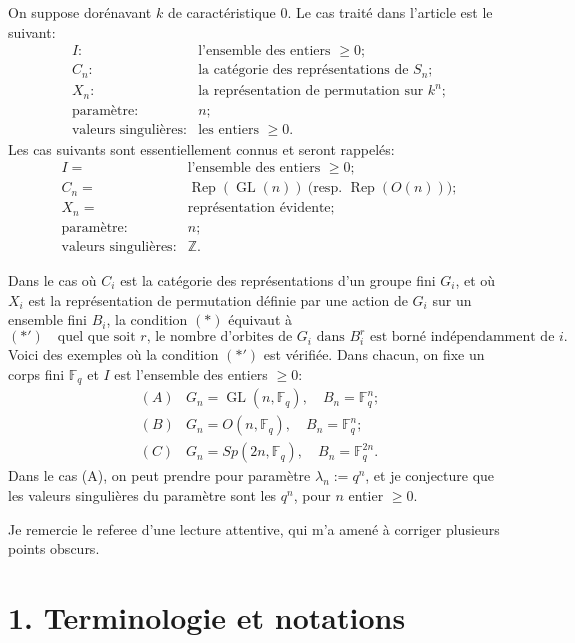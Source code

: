 \documentclass[11pt]{article}
\newcommand{\Rep}{\operatorname{Rep}}
\newcommand{\GL}{\operatorname{GL}}
\newcommand{\Z}{\mathbb Z}
\theoremstyle{deligne}
\begin{document}
On suppose dorénavant \(k\) de caractéristique \(0\). Le cas traité dans l'article est le suivant:
\[
\begin{array}{rl}
I: & \text{l'ensemble des entiers }\geq0;\\
C_n: & \text{la catégorie des représentations de }S_n;\\
X_n: & \text{la représentation de permutation sur }k^n;\\
\text{paramètre:} & n;\\
\text{valeurs singulières:} & \text{les entiers }\geq0.
\end{array}
\]
Les cas suivants sont essentiellement connus et seront rappelés:
\[
\begin{array}{rl}
I=&\text{l'ensemble des entiers }\geq0;\\
C_n=&\Rep(\GL(n))\ \text{(resp. }\Rep(O(n))\text{)};\\
X_n=&\text{représentation évidente};\\
\text{paramètre:}&n;\\
\text{valeurs singulières:}&\Z.
\end{array}
\]

Dans le cas où \(C_i\) est la catégorie des représentations d'un groupe fini \(G_i\), et où \(X_i\) est la représentation de permutation définie par une action de \(G_i\) sur un ensemble fini \(B_i\), la condition \((*)\) équivaut à
\[
  (*')\quad \text{quel que soit \(r\), le nombre d'orbites de \(G_i\) dans \(B_i^r\) est borné indépendamment de \(i\).}
\]
Voici des exemples où la condition \((*')\) est vérifiée. Dans chacun, on fixe un corps fini \(\mathbb F_q\) et \(I\) est l'ensemble des entiers \(\geq0\):
\[
\begin{array}{ll}
(A)&G_n=\GL(n,\mathbb F_q),\quad B_n=\mathbb F_q^n;\\
(B)&G_n=O(n,\mathbb F_q),\quad B_n=\mathbb F_q^n;\\
(C)&G_n=Sp(2n,\mathbb F_q),\quad B_n=\mathbb F_q^{2n}.
\end{array}
\]
Dans le cas (A), on peut prendre pour paramètre \(\lambda_n:=q^n\), et je conjecture que les valeurs singulières du paramètre sont les \(q^n\), pour \(n\) entier \(\geq0\).

Je remercie le referee d'une lecture attentive, qui m'a amené à corriger plusieurs points obscurs.

\section*{1. Terminologie et notations}
\end{document}
